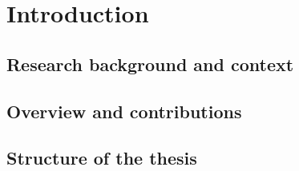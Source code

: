 
\chapter{Introduction}
\label{ch:introduction}

\section{Research background and context}\label{sec:research-background-and-context}

\section{Overview and contributions}\label{sec:overview-and-contributions}

\section{Structure of the thesis}\label{sec:structure-of-the-thesis}